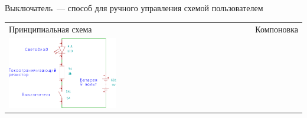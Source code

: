 \clearpage{}

Выключатель\ --- способ для ручного управления схемой пользователем

\bigskip\noindent
\begin{tabular}{p{} p{}}
Принципиальная схема
&
Компоновка
\\
\noindent\includegraphics[width=0.45\textwidth]{bcollis/led2/led2.pdf}
&
\\
\end{tabular}
